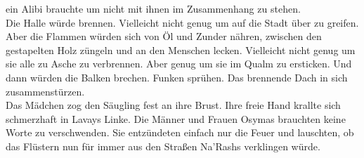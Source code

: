 ein Alibi brauchte um nicht mit ihnen im Zusammenhang zu stehen.\\
Die Halle würde brennen. Vielleicht nicht genug um auf die Stadt über zu greifen. Aber die Flammen 
würden sich von Öl und Zunder nähren, zwischen den gestapelten Holz züngeln und an den Menschen 
lecken. Vielleicht nicht genug um sie alle zu Asche zu verbrennen. Aber genug um sie im Qualm zu 
ersticken. Und dann würden die Balken brechen. Funken sprühen. Das brennende Dach in sich 
zusammenstürzen.\\
Das Mädchen zog den Säugling fest an ihre Brust. Ihre freie Hand krallte sich schmerzhaft in Lavays 
Linke. Die Männer und Frauen Osymas brauchten keine Worte zu verschwenden. Sie entzündeten 
einfach nur die Feuer und lauschten, ob das Flüstern nun für immer aus den Straßen Na'Rashs 
verklingen würde.\\

